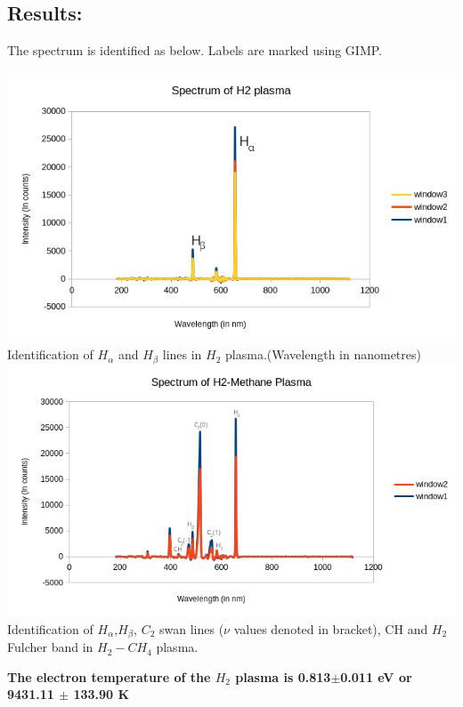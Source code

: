 \documentclass[]{report}[12 pt]
\begin{document}
\begin{itemize}
\section*{Results:}
The spectrum is identified as below. Labels are marked using GIMP.
\begin{center}
	\includegraphics[width=15cm]{h2exmod.png}\\
	Identification of $H_\alpha$ and $H_\beta$ lines in $H_2$ plasma.(Wavelength in nanometres)\\
		\includegraphics[width=18cm,height=12 cm]{h2meexmod.png}\\
	Identification of $H_\alpha$,$H_\beta$, $C_2$ swan lines ($\nu$ values denoted in bracket), CH and $H_2$ Fulcher band in $H_2-CH_4$ plasma.\\
\end{center}

\textbf{The electron temperature of the $H_2$ plasma is  0.813$\pm$0.011 eV or 9431.11 $\pm$ 133.90 K}
\end{itemize}
\end{document}
